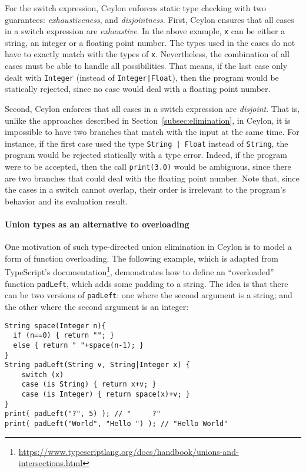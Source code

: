 For the switch expression, Ceylon enforces static type checking with two
guarantees: \textit{exhaustiveness}, and \textit{disjointness}. First, Ceylon
ensures that all cases in a switch expression are \textit{exhaustive}. In the above
example, \lstinline{x} can be either a string, an integer or a floating point
number. The types used in the cases do not have to exactly match with the types
of \lstinline{x}. Nevertheless, the combination of all cases must be able to
handle all possibilities. That means, if the last case only dealt with
\lstinline{Integer} (instead of \lstinline{Integer|Float}), then the program
would be statically rejected, since no case would deal with a floating point
number.

Second, Ceylon enforces that all cases in a switch expression are
\textit{disjoint}. That is, unlike the approaches described in
Section~\ref{subsec:elimination}, in Ceylon, it is impossible to have two
branches that match with the input at the same time. For instance, if the first
case used the type \lstinline{String | Float} instead of \lstinline{String}, the
program would be rejected statically with a type error. Indeed, if the program
were to be accepted, then the call \lstinline{print(3.0)} would be ambiguous,
since there are two branches that could deal with the floating point number. Note that, since
the cases in a switch cannot overlap, their order is irrelevant to the program's
behavior and its evaluation result.

\paragraph{Union types as an alternative to overloading}
One motivation of such type-directed union elimination in Ceylon is to
model a form of function overloading.
The following example, which is adapted from TypeScript's documentation\footnote{\url{https://www.typescriptlang.org/docs/handbook/unions-and-intersections.html}},
demonstrates how to define an ``overloaded'' function \lstinline{padLeft},
which adds some padding to a string. The idea is that there can be two versions
of \lstinline{padLeft}: one where the second argument is a string; and
the other where the second argument is an integer:

\begin{lstlisting}
String space(Integer n){
  if (n==0) { return ""; }
  else { return " "+space(n-1); }
}
String padLeft(String v, String|Integer x) {
	switch (x)
	case (is String) { return x+v; }
	case (is Integer) { return space(x)+v; }
}
print( padLeft("?", 5) ); // "     ?"
print( padLeft("World", "Hello ") ); // "Hello World"
\end{lstlisting}
%

